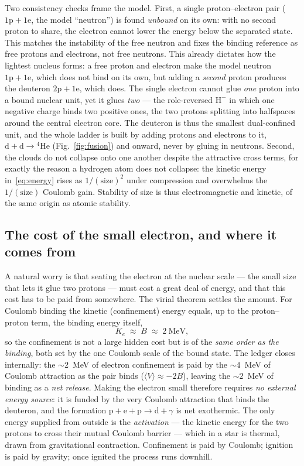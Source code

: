 \documentclass[11pt]{article}
\begin{document}
Two consistency checks frame the model. First, a single proton--electron pair
($\mathrm{1p}+\mathrm{1e}$, the model ``neutron'') is found \emph{unbound} on its own: with no
second proton to share, the electron cannot lower the energy below the separated state. This
matches the instability of the free neutron and fixes the binding reference as free protons and
electrons, not free neutrons. This already dictates how the lightest nucleus forms: a free proton
and electron make the model neutron $\mathrm{1p}+\mathrm{1e}$, which does not bind on its own, but
adding a \emph{second} proton produces the deuteron $\mathrm{2p}+\mathrm{1e}$, which does. The
single electron cannot glue \emph{one} proton into a bound nuclear unit, yet it glues \emph{two}
--- the role-reversed $\mathrm{H}^-$ in which one negative charge binds two positive ones, the two
protons splitting into halfspaces around the central electron core. The deuteron is thus the
smallest dual-confined unit, and the whole ladder is built by adding protons and electrons to it,
$\mathrm{d}+\mathrm{d}\to{}^4\mathrm{He}$ (Fig.~\ref{fig:fusion}) and onward, never by gluing in
neutrons. Second, the clouds do not collapse onto one another despite the
attractive cross terms, for exactly the reason a hydrogen atom does not collapse: the kinetic
energy in~\eqref{eq:energy} rises as $1/(\text{size})^2$ under compression and overwhelms the
$1/(\text{size})$ Coulomb gain. Stability of size is thus electromagnetic and kinetic, of the
same origin as atomic stability.

\subsection{The cost of the small electron, and where it comes from}
\label{sec:cost}

A natural worry is that seating the electron at the nuclear scale --- the small size that lets it glue
two protons --- must cost a great deal of energy, and that this cost has to be paid from somewhere. The
virial theorem settles the amount. For Coulomb binding the kinetic (confinement) energy equals, up to
the proton--proton term, the binding energy itself,
\begin{equation}
K_e \;\approx\; B \;\approx\; 2~\text{MeV},
\end{equation}
so the confinement is not a large hidden cost but is of the \emph{same order as the binding}, both set
by the one Coulomb scale of the bound state. The ledger closes internally: the $\sim\!2$~MeV of electron
confinement is paid by the $\sim\!4$~MeV of Coulomb attraction as the pair binds ($\langle V\rangle
\approx -2B$), leaving the $\sim\!2$~MeV of binding as a \emph{net release}. Making the electron small
therefore requires \emph{no external energy source}: it is funded by the very Coulomb attraction that
binds the deuteron, and the formation $\mathrm{p}+\mathrm{e}+\mathrm{p}\to\mathrm{d}+\gamma$ is net
exothermic. The only energy supplied from outside is the \emph{activation} --- the kinetic energy for
the two protons to cross their mutual Coulomb barrier --- which in a star is thermal, drawn from
gravitational contraction. Confinement is paid by Coulomb; ignition is paid by gravity; once ignited the
process runs downhill.
\end{document}
